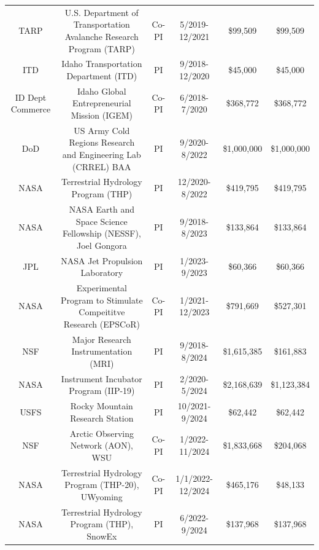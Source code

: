 \documentclass[11pt]{article}
\begin{document}
\begin{table}[!htbp]
\begin{tabular}{cccccc}
TARP             & U.S. Department of Transportation Avalanche Research Program (TARP)     & Co-PI & 5/2019-12/2021   & \$99,509     & \$99,509  \\
ITD              & Idaho Transportation Department (ITD)                                   & PI    & 9/2018-12/2020   & \$45,000     & \$45,000  \\
ID Dept Commerce & Idaho Global Entrepreneurial Mission (IGEM)                             & Co-PI & 6/2018-7/2020    & \$368,772    & \$368,772  \\
DoD              & US Army Cold Regions Research and Engineering Lab (CRREL) BAA           & PI    & 9/2020-8/2022    & \$1,000,000  & \$1,000,000   \\
NASA             & Terrestrial Hydrology Program (THP)                                     & PI    & 12/2020-8/2022   & \$419,795    & \$419,795 \\
NASA             & NASA Earth and Space Science Fellowship (NESSF), Joel Gongora           & PI    & 9/2018-8/2023    & \$133,864    & \$133,864  \\
JPL              & NASA Jet Propulsion Laboratory                                          & PI    & 1/2023-9/2023    & \$60,366     & \$60,366  \\
NASA             & Experimental Program to Stimulate Compeititve Research (EPSCoR)         & Co-PI & 1/2021-12/2023   & \$791,669    & \$527,301  \\
NSF              & Major Research Instrumentation (MRI)                                    & PI    & 9/2018-8/2024    & \$1,615,385  & \$161,883 \\
NASA             & Instrument Incubator Program (IIP-19)                                   & PI    & 2/2020-5/2024    & \$2,168,639  & \$1,123,384 \\
USFS             & Rocky Mountain Research Station                                         & PI    & 10/2021-9/2024   & \$62,442     & \$62,442  \\
NSF              & Arctic Observing Network (AON), WSU                          & Co-PI & 1/2022-11/2024   & \$1,833,668  & \$204,068  \\
NASA             & Terrestrial Hydrology Program (THP-20), UWyoming          & Co-PI & 1/1/2022-12/2024 & \$465,176    & \$48,133  \\
NASA             & Terrestrial Hydrology Program (THP), SnowEx                        & PI    & 6/2022-9/2024    & \$137,968    & \$137,968  \\

\end{tabular}
\end{table}
\end{document}
